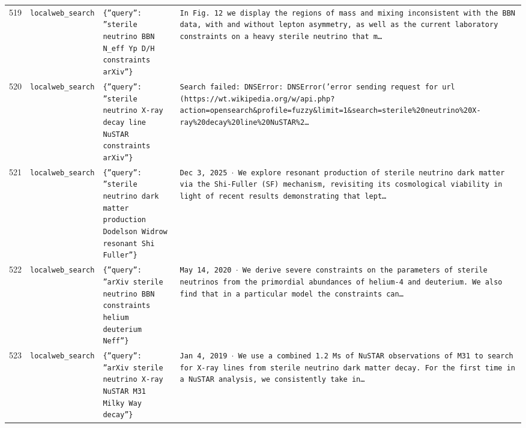 \documentclass[11pt,a4paper]{article}
\begin{document}
\begin{longtable}{@{}p{}p{}p{}p{}@{}}
519 & \texttt{local}\newline\texttt{web\_\allowbreak{}search} & \texttt{\{''query'':\allowbreak{} ''sterile neutrino BBN N\_\allowbreak{}eff Yp D/\allowbreak{}H constraints arXiv''\}\allowbreak{}} & \texttt{In Fig. 12 we display the regions of mass and mixing inconsistent with the BBN data,\allowbreak{} with and without lepton asymmetry,\allowbreak{} as well as the current laboratory constraints on a heavy sterile neutrino that m\ldots{}\allowbreak{}} \\
520 & \texttt{local}\newline\texttt{web\_\allowbreak{}search} & \texttt{\{''query'':\allowbreak{} ''sterile neutrino X-ray decay line NuSTAR constraints arXiv''\}\allowbreak{}} & \texttt{Search failed:\allowbreak{} DNSError:\allowbreak{} DNSError('error sending request for url (https:\allowbreak{}/\allowbreak{}/\allowbreak{}wt.wikipedia.org/\allowbreak{}w/\allowbreak{}api.php?action=\allowbreak{}opensearch\&profile=\allowbreak{}fuzzy\&limit=\allowbreak{}1\&search=\allowbreak{}sterile\%20neutrino\%20X-ray\%20decay\%20line\%20NuSTAR\%2\ldots{}\allowbreak{}} \\
521 & \texttt{local}\newline\texttt{web\_\allowbreak{}search} & \texttt{\{''query'':\allowbreak{} ''sterile neutrino dark matter production Dodelson Widrow resonant Shi Fuller''\}\allowbreak{}} & \texttt{Dec 3,\allowbreak{} 2025 $\cdot$ We explore resonant production of sterile neutrino dark matter via the Shi-Fuller (SF)\allowbreak{} mechanism,\allowbreak{} revisiting its cosmological viability in light of recent results demonstrating that lept\ldots{}\allowbreak{}} \\
522 & \texttt{local}\newline\texttt{web\_\allowbreak{}search} & \texttt{\{''query'':\allowbreak{} ''arXiv sterile neutrino BBN constraints helium deuterium Neff''\}\allowbreak{}} & \texttt{May 14,\allowbreak{} 2020 $\cdot$ We derive severe constraints on the parameters of sterile neutrinos from the primordial abundances of helium-4 and deuterium. We also find that in a particular model the constraints can\ldots{}\allowbreak{}} \\
523 & \texttt{local}\newline\texttt{web\_\allowbreak{}search} & \texttt{\{''query'':\allowbreak{} ''arXiv sterile neutrino X-ray NuSTAR M31 Milky Way decay''\}\allowbreak{}} & \texttt{Jan 4,\allowbreak{} 2019 $\cdot$ We use a combined 1.2 Ms of NuSTAR observations of M31 to search for X-ray lines from sterile neutrino dark matter decay. For the first time in a NuSTAR analysis,\allowbreak{} we consistently take in\ldots{}\allowbreak{}} \\

\end{longtable}
\end{document}
